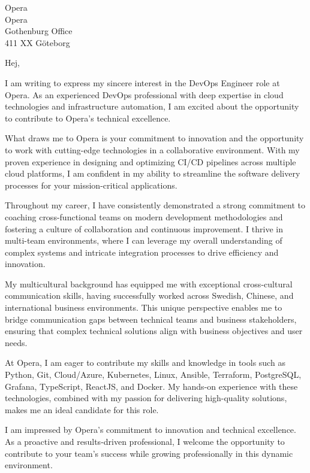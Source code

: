 \documentclass[a4paper,10pt]{article}
\begin{document}
\pagestyle{empty} %

{\color{darkblue}
Opera\\
Opera\\Gothenburg Office\\
411 XX Göteborg}

\vspace{40pt}

Hej,

\vspace{10pt}

I am writing to express my sincere interest in the DevOps Engineer role at Opera. As an experienced DevOps professional with deep expertise in cloud technologies and infrastructure automation, I am excited about the opportunity to contribute to Opera's technical excellence.

What draws me to Opera is your commitment to innovation and the opportunity to work with cutting-edge technologies in a collaborative environment. With my proven experience in designing and optimizing CI/CD pipelines across multiple cloud platforms, I am confident in my ability to streamline the software delivery processes for your mission-critical applications.

Throughout my career, I have consistently demonstrated a strong commitment to coaching cross-functional teams on modern development methodologies and fostering a culture of collaboration and continuous improvement. I thrive in multi-team environments, where I can leverage my overall understanding of complex systems and intricate integration processes to drive efficiency and innovation.
        
My multicultural background has equipped me with exceptional cross-cultural communication skills, having successfully worked across Swedish, Chinese, and international business environments. This unique perspective enables me to bridge communication gaps between technical teams and business stakeholders, ensuring that complex technical solutions align with business objectives and user needs.

At Opera, I am eager to contribute my skills and knowledge in tools such as Python, Git, Cloud/Azure, Kubernetes, Linux, Ansible, Terraform, PostgreSQL, Grafana, TypeScript, ReactJS, and Docker. My hands-on experience with these technologies, combined with my passion for delivering high-quality solutions, makes me an ideal candidate for this role.

I am impressed by Opera's commitment to innovation and technical excellence. As a proactive and results-driven professional, I welcome the opportunity to contribute to your team's success while growing professionally in this dynamic environment.
\end{document}
